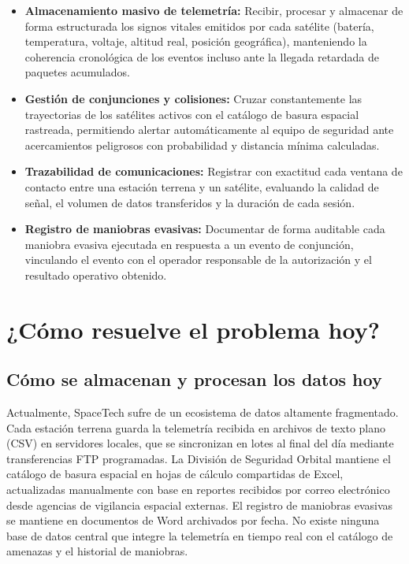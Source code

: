 \begin{itemize}
    \item \textbf{Almacenamiento masivo de telemetría:} Recibir, procesar y almacenar de forma estructurada los signos vitales emitidos por cada satélite (batería, temperatura, voltaje, altitud real, posición geográfica), manteniendo la coherencia cronológica de los eventos incluso ante la llegada retardada de paquetes acumulados.
    \item \textbf{Gestión de conjunciones y colisiones:} Cruzar constantemente las trayectorias de los satélites activos con el catálogo de basura espacial rastreada, permitiendo alertar automáticamente al equipo de seguridad ante acercamientos peligrosos con probabilidad y distancia mínima calculadas.
    \item \textbf{Trazabilidad de comunicaciones:} Registrar con exactitud cada ventana de contacto entre una estación terrena y un satélite, evaluando la calidad de señal, el volumen de datos transferidos y la duración de cada sesión.
    \item \textbf{Registro de maniobras evasivas:} Documentar de forma auditable cada maniobra evasiva ejecutada en respuesta a un evento de conjunción, vinculando el evento con el operador responsable de la autorización y el resultado operativo obtenido.
\end{itemize}

\section{¿Cómo resuelve el problema hoy?}

\subsection{Cómo se almacenan y procesan los datos hoy}

Actualmente, SpaceTech sufre de un ecosistema de datos altamente fragmentado. Cada estación terrena guarda la telemetría recibida en archivos de texto plano (CSV) en servidores locales, que se sincronizan en lotes al final del día mediante transferencias FTP programadas. La División de Seguridad Orbital mantiene el catálogo de basura espacial en hojas de cálculo compartidas de Excel, actualizadas manualmente con base en reportes recibidos por correo electrónico desde agencias de vigilancia espacial externas. El registro de maniobras evasivas se mantiene en documentos de Word archivados por fecha. No existe ninguna base de datos central que integre la telemetría en tiempo real con el catálogo de amenazas y el historial de maniobras.

